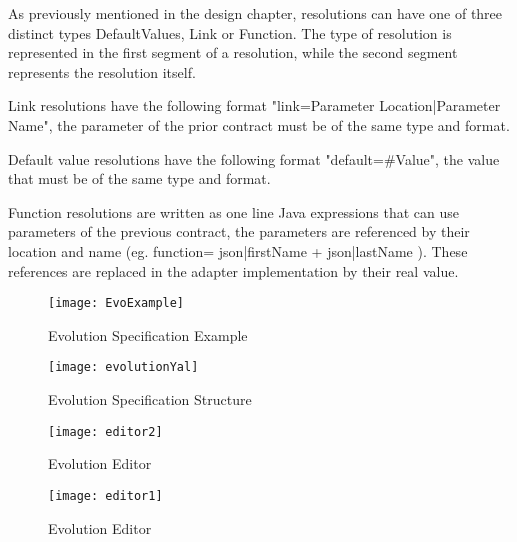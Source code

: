 As previously mentioned in the design chapter, resolutions can have one of three distinct types
DefaultValues, Link or Function.
The type of resolution is represented in the first segment of a resolution, while the second segment represents the resolution itself.

Link resolutions have the following format "link={Parameter Location}|{Parameter Name}", the parameter of the prior contract must be of the same type and format.

Default value resolutions have the following format "default=#Value", the value that must be of the same type and format.

Function resolutions are written as one line Java expressions that can use parameters of the previous contract, the
parameters are referenced by their location and name (eg. function= {{json|firstName}} + {{json|lastName}} ).
These references are replaced in the adapter implementation by their real value.

\begin{figure}[htbp]
    \centering
    \texttt{[image: EvoExample]}
    \caption{Evolution Specification Example}
    \label{fig:evolution_example}
\end{figure}

\begin{figure}[htbp]
    \centering
    \texttt{[image: evolutionYal]}
    \caption{Evolution Specification Structure}
    \label{fig:evolution_yal}
\end{figure}

\newpage

\begin{figure}[htbp]
    \centering
    \texttt{[image: editor2]}
    \caption{Evolution Editor}
    \label{fig:editor2}
\end{figure}

\begin{figure}[htbp]
    \centering
    \texttt{[image: editor1]}
    \caption{Evolution Editor}
    \label{fig:editor1}
\end{figure}

\newpage

